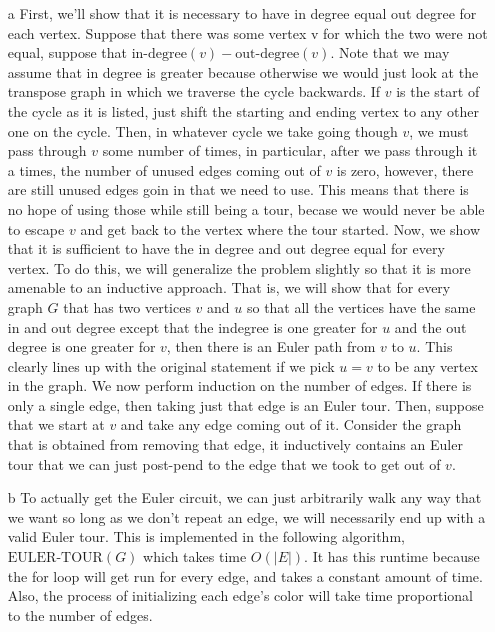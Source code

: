 \documentclass{article}
\begin{document}
\begin{enumerate}
  \item[a] First, we'll show that it is necessary to have in degree equal out degree for each vertex. Suppose that there was some vertex v for which the two were not equal, suppose that $\text{in-degree}(v) - \text{out-degree}(v)$. Note that we may assume that in degree is greater because otherwise we would just look at the transpose graph in which we traverse the cycle backwards. If $v$ is the start of the cycle as it is listed, just shift the starting and ending vertex to any other one on the cycle. Then, in whatever cycle we take going though $v$, we must pass through $v$ some number of times, in particular, after we pass through it a times, the number of unused edges coming out of $v$ is zero, however, there are still unused edges goin in that we need to use. This means that there is no hope of using those while still being a tour, becase we would never be able to escape $v$ and get back to the vertex where the tour started. Now, we show that it is sufficient to have the in degree and out degree equal for every vertex. To do this, we will generalize the problem slightly so that it is more amenable to an inductive approach. That is, we will show that for every graph $G$ that has two vertices $v$ and $u$ so that all the vertices have the same in and out degree except that the indegree is one greater for $u$ and the out degree is one greater for $v$, then there is an Euler path from $v$ to $u$. This clearly lines up with the original statement if we pick $u = v$ to be any vertex in the graph. We now perform induction on the number of edges. If there is only a single edge, then taking just that edge is an Euler tour. Then, suppose that we start at $v$ and take any edge coming out of it. Consider the graph that is obtained from removing that edge, it inductively contains an Euler tour that we can just post-pend to the edge that we took to get out of $v$.
  \item[b] To actually get the Euler circuit, we can just arbitrarily walk any way that we want so long as we don't repeat an edge, we will necessarily end up with a valid Euler tour. This is implemented in the following algorithm, $\text{EULER-TOUR}(G)$ which takes time $O(|E|)$. It has this runtime because the for loop will get run for every edge, and takes a constant amount of time. Also, the process of initializing each edge's color will take time proportional to the number of edges.
\end{enumerate}
\end{document}
